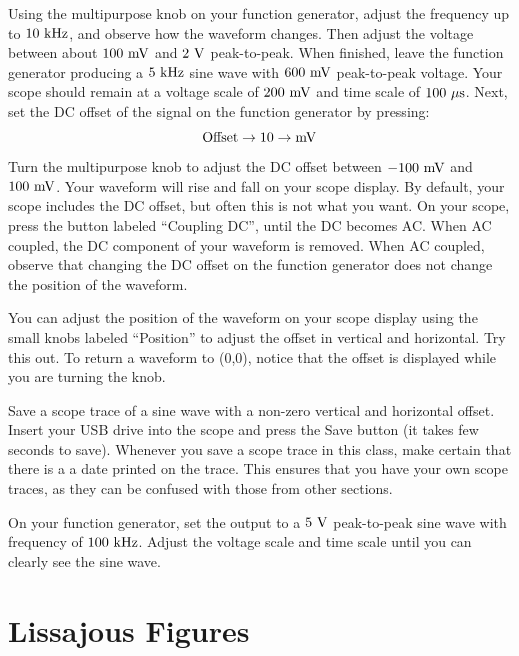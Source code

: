 Using the multipurpose knob on your function generator, adjust the
frequency up to $10~\rm kHz$, and observe how the waveform changes.
Then adjust the voltage between about $100~\rm mV$ and $2~\rm V$
peak-to-peak.  When finished, leave the function generator producing a
$5~\rm kHz$ sine wave with $600~\rm mV$ peak-to-peak voltage.  Your
scope should remain at a voltage scale of $200~\rm mV$ and time scale
of $100~\rm \mu s$.  Next, set the DC offset of the signal on the
function generator by pressing:
\begin{displaymath}
{\rm Offset \to 10 \to mV}
\end{displaymath}
Turn the multipurpose knob to adjust the DC offset between $-100~\rm
mV$ and $100~\rm mV$.  Your waveform will rise and fall on your scope
display.  By default, your scope includes the DC offset, but often
this is not what you want.  On your scope, press the button labeled
``Coupling DC'', until the DC becomes AC.  When AC coupled, the DC
component of your waveform is removed.  When AC coupled, observe that
changing the DC offset on the function generator does not change the
position of the waveform.

You can adjust the position of the waveform on your scope display
using the small knobs labeled ``Position'' to adjust the offset in
vertical and horizontal.  Try this out.  To return a waveform to
(0,0), notice that the offset is displayed while you are turning the
knob.

\begin{plot}
Save a scope trace of a sine wave with a non-zero vertical and horizontal
offset. Insert your USB drive into the scope and press the Save button
(it takes few seconds to save).  Whenever you save a scope trace in
this class, make certain that there is a a date printed on the trace.
This ensures that you have your own scope traces, as they can be
confused with those from other sections.
\end{plot}

On your function generator, set the output to a $5~\rm V$ peak-to-peak
sine wave with frequency of $100~\rm kHz$.  Adjust the voltage scale
and time scale until you can clearly see the sine wave.

\section{Lissajous Figures}

